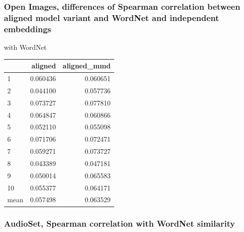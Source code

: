 \subsubsection{Open Images, differences of Spearman correlation between aligned model variant and WordNet and independent embeddings} with WordNet\\


\begin{tabular}{lrr}
\toprule
{} &   aligned &  aligned\_mmd \\
\midrule
1    &  0.060436 &     0.060651 \\
2    &  0.044100 &     0.057736 \\
3    &  0.073727 &     0.077810 \\
4    &  0.064847 &     0.060866 \\
5    &  0.052110 &     0.055098 \\
6    &  0.071706 &     0.072471 \\
7    &  0.059271 &     0.073727 \\
8    &  0.043389 &     0.047181 \\
9    &  0.050014 &     0.065583 \\
10   &  0.055377 &     0.064171 \\
mean &  0.057498 &     0.063529 \\
\bottomrule
\end{tabular}





\subsubsection{AudioSet, Spearman correlation with WordNet similarity}

